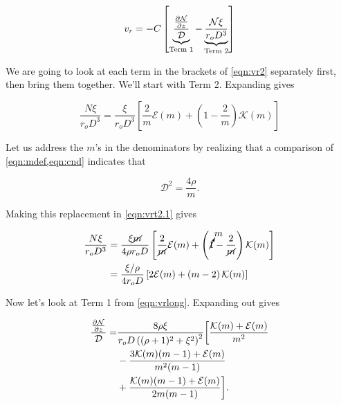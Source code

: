 \begin{equation}
    \label{eqn:vr2}
    v_r  = -C \left[ \underbrace{\frac{\pd{\mathcal{N}}{z}}{\mathcal{D}}}_\text{Term 1}
    -\underbrace{\frac{\mathcal{N}\xi}{r_oD^3}}_\text{Term 2}\right]
\end{equation}

\noindent We are going to look at each term in the brackets of \cref{eqn:vr2} separately first, then bring them together.
%
We'll start with Term 2.
%
Expanding gives

\begin{equation}
    \label{eqn:vrt2.1}
    \frac{N\xi}{r_oD^3} =  \frac{\xi}{r_oD^3} \left[\frac{2}{m}\mathcal{E}(m) + \left(1-\frac{2}{m}\right)\mathcal{K}(m)\right]
\end{equation}

\noindent Let us address the \(m\)'s in the denominators by realizing that a comparison of \cref{eqn:mdef,eqn:cnd} indicates that

\begin{equation}
    \mathcal{D}^2 = \frac{4\rho}{m}.
\end{equation}

\noindent Making this replacement in \cref{eqn:vrt2.1} gives

\begin{equation}
    \label{eqn:term2simple}
    \begin{aligned}
        \frac{N\xi}{r_oD^3} &= \frac{\xi \cancel{m}}{4\rho r_o D} \left[ \frac{2}{\cancel{m}}\mathcal{E}(m) + \left(\cancelto{m}{1} - \frac{2}{\cancel{m}} \right)\mathcal{K}(m) \right] \\
        &= \frac{\xi/\rho }{4 r_o D} \left[ 2\mathcal{E}(m) + \left(m - 2 \right)\mathcal{K}(m) \right]
    \end{aligned}
\end{equation}

Now let's look at Term 1 from \cref{eqn:vrlong}.
%
Expanding out gives

\begin{equation}
    \begin{split}
        \frac{\frac{\partial \mathcal{N}}{\partial z}}{\mathcal{D}} =& \frac{8\rho \xi}{r_o D \left((\rho+1)^2 + \xi^2\right)^2} \bigg[ \frac{\mathcal{K}(m)+\mathcal{E}(m)}{m^2}\\
         &- \frac{3\mathcal{K}(m)(m-1)+\mathcal{E}(m)}{m^2(m-1)}\\
         &+ \frac{\mathcal{K}(m)(m-1)+\mathcal{E}(m)}{2m(m-1)} \bigg].
    \end{split}
\end{equation}

